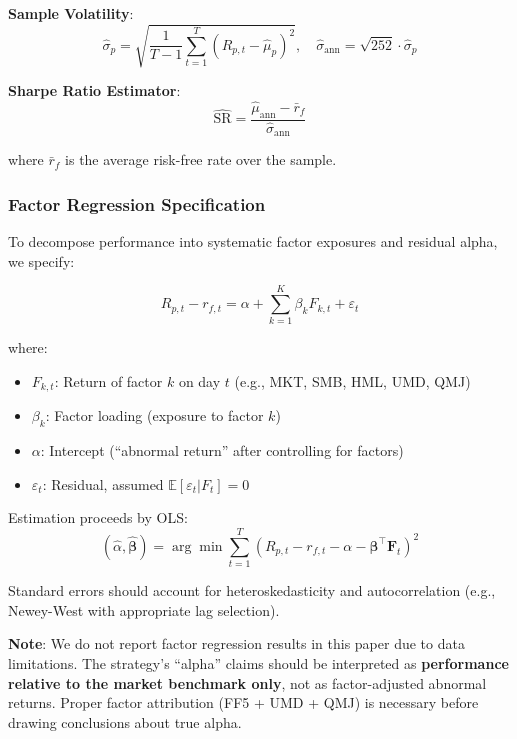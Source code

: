 \documentclass[12pt,a4paper]{article}
\theoremstyle{definition}
\newcommand{\E}{\mathbb{E}}
\newcommand{\bm}[1]{\boldsymbol{#1}}
\begin{document}
\textbf{Sample Volatility}:
\begin{equation}
\hat{\sigma}_p = \sqrt{\frac{1}{T-1} \sum_{t=1}^{T} (R_{p,t} - \hat{\mu}_p)^2}, \quad \hat{\sigma}_{\text{ann}} = \sqrt{252} \cdot \hat{\sigma}_p
\end{equation}

\textbf{Sharpe Ratio Estimator}:
\begin{equation}
\widehat{\text{SR}} = \frac{\hat{\mu}_{\text{ann}} - \bar{r}_f}{\hat{\sigma}_{\text{ann}}}
\label{eq:sharpe_estimator}
\end{equation}

where $\bar{r}_f$ is the average risk-free rate over the sample.

\subsubsection{Factor Regression Specification}

To decompose performance into systematic factor exposures and residual alpha, we specify:

\begin{equation}
R_{p,t} - r_{f,t} = \alpha + \sum_{k=1}^{K} \beta_k F_{k,t} + \varepsilon_t
\label{eq:factor_regression}
\end{equation}

where:
\begin{itemize}
    \item $F_{k,t}$: Return of factor $k$ on day $t$ (e.g., MKT, SMB, HML, UMD, QMJ)
    \item $\beta_k$: Factor loading (exposure to factor $k$)
    \item $\alpha$: Intercept (``abnormal return'' after controlling for factors)
    \item $\varepsilon_t$: Residual, assumed $\E[\varepsilon_t | F_t] = 0$
\end{itemize}

Estimation proceeds by OLS:
\begin{equation}
(\hat{\alpha}, \hat{\bm{\beta}}) = \arg\min \sum_{t=1}^{T} \left( R_{p,t} - r_{f,t} - \alpha - \bm{\beta}^\top \bm{F}_t \right)^2
\end{equation}

Standard errors should account for heteroskedasticity and autocorrelation (e.g., Newey-West with appropriate lag selection).

\textbf{Note}: We do not report factor regression results in this paper due to data limitations. The strategy's ``alpha'' claims should be interpreted as \textbf{performance relative to the market benchmark only}, not as factor-adjusted abnormal returns. Proper factor attribution (FF5 + UMD + QMJ) is necessary before drawing conclusions about true alpha.
\end{document}

